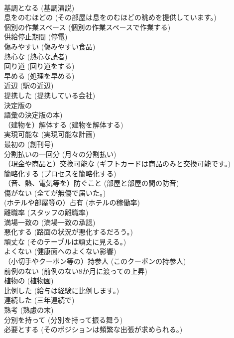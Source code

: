 \documentclass[8pt]{extreport}
\begin{document}
\begin{CJK}{UTF8}{min}
\\	基調となる	(基調演説)		
\\	息をのむほどの	(その部屋は息をのむほどの眺めを提供しています。)		
\\	個別の作業スペース	(個別の作業スペースで作業する)		
\\	供給停止期間	(停電)		
\\	傷みやすい	(傷みやすい食品)		
\\	熱心な	(熱心な読者)		
\\	回り道	(回り道をする)		
\\	早める	(処理を早める)		
\\	近辺	(駅の近辺)		
\\	提携した	(提携している会社)		
\\	決定版の	
\\	語彙の決定版の本)		
\\	（建物を）解体する	(建物を解体する)		
\\	実現可能な	(実現可能な計画)		
\\	最初の	(創刊号)		
\\	分割払いの一回分	(月々の分割払い)		
\\	（現金や商品と）交換可能な	(ギフトカードは商品のみと交換可能です。)		
\\	簡略化する	(プロセスを簡略化する)		
\\	（音、熱、電気等を）防ぐこと	(部屋と部屋の間の防音)		
\\	傷がない	(全てが無傷で届いた。)		
\\	(ホテルや部屋等の）占有	(ホテルの稼働率)		
\\	離職率	(スタッフの離職率)		
\\	満場一致の	(満場一致の承認)		
\\	悪化する	(路面の状況が悪化するだろう。)		
\\	頑丈な	(そのテーブルは頑丈に見える。)		
\\	よくない	(健康面へのよくない影響)		
\\	（小切手やクーポン等の）持参人	(このクーポンの持参人)		
\\	前例のない	(前例のない8か月に渡っての上昇)		
\\	植物の	(植物園)		
\\	比例した	(給与は経験に比例します。)		
\\	連続した	(三年連続で)		
\\	熟考	(熟慮の末)		
\\	分別を持って	(分別を持って振る舞う)		
\\	必要とする	(そのポジションは頻繁な出張が求められる。)		

\end{CJK}
\end{document}
